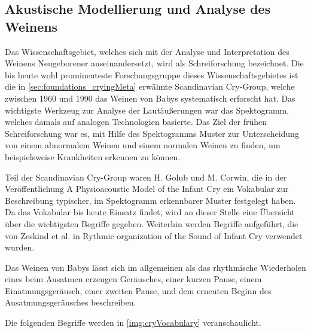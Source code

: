 \subsection{Akustische Modellierung und Analyse des Weinens}
\label{sec:acousticModel}

Das Wissenschaftsgebiet, welches sich mit der Analyse und Interpretation des Weinens Neugeborener auseinandersetzt, wird als \glqq Schreiforschung\grqq{} bezeichnet. Die bis heute wohl prominenteste Forschungsgruppe dieses Wissenschaftsgebietes ist die in \autoref{sec:foundations_cryingMeta} erwähnte \glqq Scandinavian Cry-Group\grqq \cite{crygroup}, welche zwischen 1960 und 1990 das Weinen von Babys systematisch erforscht hat. Das wichtigste Werkzeug zur Analyse der Lautäußerungen war das Spektogramm, welches damals auf analogen Technologien basierte. Das Ziel der frühen Schreiforschung war es, mit Hilfe des Spektogramms Muster zur Unterscheidung von einem abnormalem Weinen und einem normalen Weinen zu finden, um beispielsweise Krankheiten erkennen zu können.\cite[S. 142]{signal} 

Teil der Scandinavian Cry-Group waren H. Golub und M. Corwin, die in der Veröffentlichung \glqq A Physioacoustic Model of the Infant Cry\grqq \cite{cryModel} ein Vokabular zur Beschreibung typischer, im Spektogramm erkennbarer Muster festgelegt haben. Da das Vokabular bis heute Einsatz findet, wird an dieser Stelle eine Übersicht über die wichtigsten Begriffe gegeben. Weiterhin werden Begriffe aufgeführt, die von Zeskind et al. in \glqq Rythmic organization of the Sound of Infant Cry\grqq{} verwendet wurden.\cite{rythmic}

Das Weinen von Babys lässt sich im allgemeinen als das \glqq rhythmische Wiederholen eines beim Ausatmen erzeugen Geräusches, einer kurzen Pause, einem Einatmungsgeräusch, einer zweiten Pause, und dem erneuten Beginn des Ausatmungsgeräusches\grqq{} beschreiben.\cite{wolff}

Die folgenden Begriffe werden in \autoref{img:cryVocabulary} veranschaulicht.

